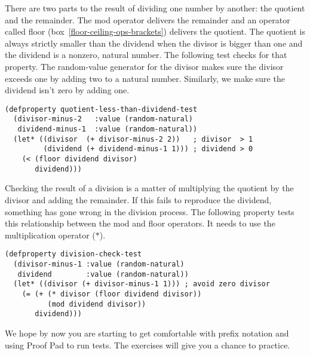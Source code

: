 There are two parts to the result
of dividing one number by another: the quotient and the remainder.
The \textsf{mod} operator delivers the remainder
and an operator called \textsf{floor} (box~\ref{floor-ceiling-ops-brackets})
delivers the quotient.
The quotient is always strictly smaller
than the dividend when the divisor is bigger than one
and the dividend is a nonzero, natural number.
The following test checks for that property.
The random-value generator for the divisor
makes sure the divisor exceeds one by adding two
to a natural number.
Similarly, we make sure the dividend isn't zero by adding one.

\label{quotient-less-than-dividend-test}
\begin{code}
\begin{verbatim}
(defproperty quotient-less-than-dividend-test
  (divisor-minus-2   :value (random-natural)
   dividend-minus-1  :value (random-natural))
  (let* ((divisor  (+ divisor-minus-2 2))   ; divisor  > 1
         (dividend (+ dividend-minus-1 1))) ; dividend > 0
    (< (floor dividend divisor)
       dividend)))
\end{verbatim}
\end{code}

Checking the result of a division is a matter
of multiplying the quotient by the divisor and adding the remainder.
If this fails to reproduce the dividend,
something has gone wrong in the division process.
The following property tests this relationship
between the \textsf{mod} and \textsf{floor} operators.
It needs to use the multiplication operator ($*$).

\label{division-check-test}
\begin{code}
\begin{verbatim}
(defproperty division-check-test
  (divisor-minus-1 :value (random-natural)
   dividend        :value (random-natural))
  (let* ((divisor (+ divisor-minus-1 1))) ; avoid zero divisor
    (= (+ (* divisor (floor dividend divisor))
          (mod dividend divisor))
       dividend)))
\end{verbatim}
\end{code}

We hope by now you are starting to get comfortable with prefix notation
and using Proof Pad to run tests.
The exercises will give you a chance to practice.

